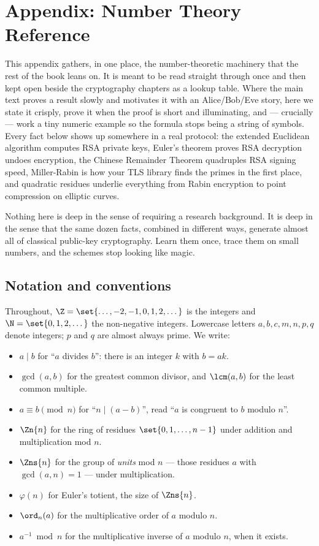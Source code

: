 \chapter{Appendix: Number Theory Reference}

This appendix gathers, in one place, the number-theoretic machinery that the rest of the book
leans on. It is meant to be read straight through once and then kept open beside the cryptography
chapters as a lookup table. Where the main text proves a result slowly and motivates it with an
Alice/Bob/Eve story, here we state it crisply, prove it when the proof is short and illuminating,
and --- crucially --- work a tiny numeric example so the formula stops being a string of symbols.
Every fact below shows up somewhere in a real protocol: the extended Euclidean algorithm computes
RSA private keys, Euler's theorem proves RSA decryption undoes encryption, the Chinese Remainder
Theorem quadruples RSA signing speed, Miller-Rabin is how your TLS library finds the primes in the
first place, and quadratic residues underlie everything from Rabin encryption to point compression
on elliptic curves.

Nothing here is deep in the sense of requiring a research background. It is deep in the sense that
the same dozen facts, combined in different ways, generate almost all of classical public-key
cryptography. Learn them once, trace them on small numbers, and the schemes stop looking like magic.

\chapterline

\section{Notation and conventions}
\label{ch40:notation}

Throughout, $\Z = \set{\dots,-2,-1,0,1,2,\dots}$ is the integers and $\N = \set{0,1,2,\dots}$ the
non-negative integers. Lowercase letters $a,b,c,m,n,p,q$ denote integers; $p$ and $q$ are almost
always prime. We write:

\begin{itemize}
\item $a \mid b$ for ``$a$ divides $b$'': there is an integer $k$ with $b = ak$.
\item $\gcd(a,b)$ for the greatest common divisor, and $\lcm(a,b)$ for the least common multiple.
\item $a \equiv b \pmod{n}$ for ``$n \mid (a-b)$'', read ``$a$ is congruent to $b$ modulo $n$''.
\item $\Zn{n}$ for the ring of residues $\set{0,1,\dots,n-1}$ under addition and multiplication
      mod $n$.
\item $\Zns{n}$ for the group of \emph{units} mod $n$ --- those residues $a$ with $\gcd(a,n)=1$ ---
      under multiplication.
\item $\varphi(n)$ for Euler's totient, the size of $\Zns{n}$.
\item $\ord_n(a)$ for the multiplicative order of $a$ modulo $n$.
\item $a^{-1} \bmod n$ for the multiplicative inverse of $a$ modulo $n$, when it exists.
\end{itemize}

